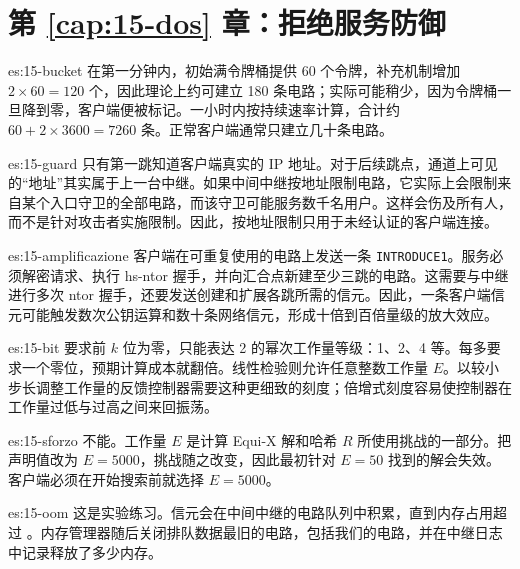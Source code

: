 \section*{第 \ref{cap:15-dos} 章：拒绝服务防御}

\begin{soluzione}{es:15-bucket}
在第一分钟内，初始满令牌桶提供 60 个令牌，补充机制增加 $2\times60=120$ 个，因此理论上约可建立 180 条电路；实际可能稍少，因为令牌桶一旦降到零，客户端便被标记。一小时内按持续速率计算，合计约 $60+2\times3600=7260$ 条。正常客户端通常只建立几十条电路。
\end{soluzione}

\begin{soluzione}{es:15-guard}
只有第一跳知道客户端真实的 IP 地址。对于后续跳点，通道上可见的\enquote{地址}其实属于上一台中继。如果中间中继按地址限制电路，它实际上会限制来自某个入口守卫的全部电路，而该守卫可能服务数千名用户。这样会伤及所有人，而不是针对攻击者实施限制。因此，按地址限制只用于未经认证的客户端连接。
\end{soluzione}

\begin{soluzione}{es:15-amplificazione}
客户端在可重复使用的电路上发送一条 \texttt{INTRODUCE1}。服务必须解密请求、执行 hs-ntor 握手，并向汇合点新建至少三跳的电路。这需要与中继进行多次 ntor 握手，还要发送创建和扩展各跳所需的信元。因此，一条客户端信元可能触发数次公钥运算和数十条网络信元，形成十倍到百倍量级的放大效应。
\end{soluzione}

\begin{soluzione}{es:15-bit}
要求前 $k$ 位为零，只能表达 2 的幂次工作量等级：1、2、4 等。每多要求一个零位，预期计算成本就翻倍。线性检验则允许任意整数工作量 $E$。以较小步长调整工作量的反馈控制器需要这种更细致的刻度；倍增式刻度容易使控制器在工作量过低与过高之间来回振荡。
\end{soluzione}

\begin{soluzione}{es:15-sforzo}
不能。工作量 $E$ 是计算 Equi-X 解和哈希 $R$ 所使用挑战的一部分。把声明值改为 $E=5000$，挑战随之改变，因此最初针对 $E=50$ 找到的解会失效。客户端必须在开始搜索前就选择 $E=5000$。
\end{soluzione}

\begin{soluzione}{es:15-oom}
这是实验练习。信元会在中间中继的电路队列中积累，直到内存占用超过 。内存管理器随后关闭排队数据最旧的电路，包括我们的电路，并在中继日志中记录释放了多少内存。
\end{soluzione}

